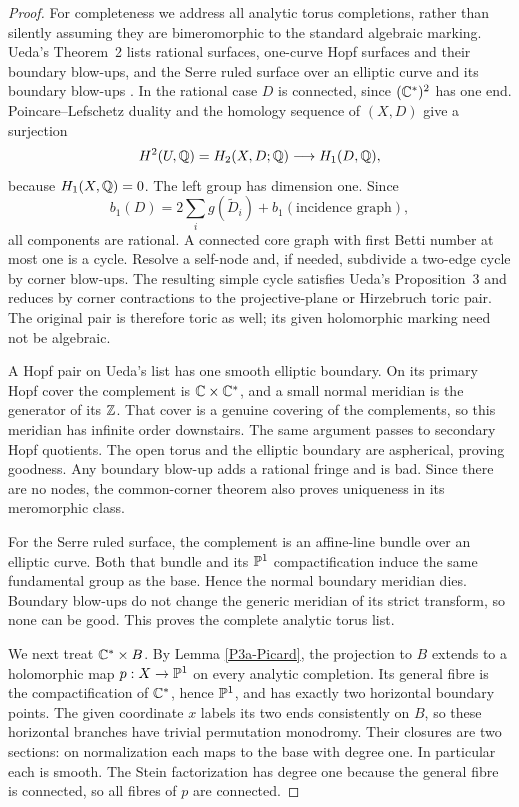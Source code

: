 \begin{proof}
For completeness we address all analytic torus completions,
rather than silently assuming they are bimeromorphic to the
standard algebraic marking. Ueda's Theorem~2 lists rational
surfaces, one-curve Hopf surfaces and their boundary blow-ups,
and the Serre ruled surface over an elliptic curve and its
boundary blow-ups \citep[p.~81]{Ueda1979}.
In the rational case $D$ is connected, since $(\mathbb C^*)^2$ has one
end. Poincare--Lefschetz duality and the homology sequence of
$(X,D)$ give a surjection
\[
 H^2(U,\mathbb Q)=H_2(X,D;\mathbb Q)\longrightarrow H_1(D,\mathbb Q),
\]
because $H_1(X,\mathbb Q)=0$. The left group has dimension one. Since
\[
 b_1(D)=2\sum_i g(\widetilde D_i)+b_1(\text{incidence graph}),
\]
all components are rational. A connected core graph with first
Betti number at most one is a cycle. Resolve a self-node and,
if needed, subdivide a two-edge cycle by corner blow-ups.
The resulting simple cycle satisfies Ueda's Proposition~3 and
reduces by corner contractions to the projective-plane or
Hirzebruch toric pair. The original pair is therefore toric
as well; its given holomorphic marking need not be algebraic.

A Hopf pair on Ueda's list has one smooth elliptic boundary.
On its primary Hopf cover the complement is $\mathbb C\times\mathbb C^*$,
and a small normal meridian is the generator of its $\mathbb Z$.
That cover is a genuine covering of the complements, so this
meridian has infinite order downstairs. The same argument
passes to secondary Hopf quotients. The open torus and the
elliptic boundary are aspherical, proving goodness. Any
boundary blow-up adds a rational fringe and is bad. Since
there are no nodes, the common-corner theorem also proves
uniqueness in its meromorphic class.

For the Serre ruled surface, the complement is an affine-line
bundle over an elliptic curve. Both that bundle and its
$\mathbb P^1$ compactification induce the same fundamental group
as the base. Hence the normal boundary meridian dies. Boundary
blow-ups do not change the generic meridian of its strict
transform, so none can be good. This proves the complete
analytic torus list.

We next treat $\mathbb C^*\times B$. By Lemma \ref{P3a-Picard}, the
projection to $B$ extends to a holomorphic map
$p:X\to\mathbb P^1$ on every analytic completion. Its general fibre
is the compactification of $\mathbb C^*$, hence $\mathbb P^1$, and has
exactly two horizontal boundary points. The given coordinate
$x$ labels its two ends consistently on $B$, so these horizontal
branches have trivial permutation monodromy. Their closures
are two sections: on normalization each maps to the base
with degree one. In particular each is smooth. The Stein
factorization has degree one because the general fibre is
connected, so all fibres of $p$ are connected.


\end{proof}
